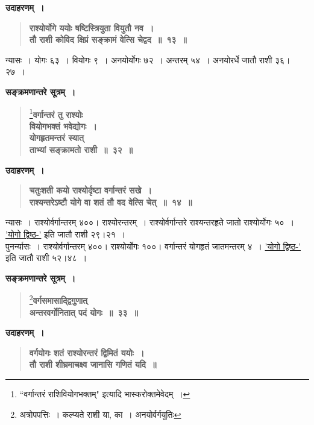 \documentclass[11pt, openany]{book}
\begin{document}
\begin{sloppypar}
\noindent \textbf{उदाहरणम्~।}

 \label{Ex 1.13}
\begin{quote}
\textbf{{\color{red}राश्योर्योगे ययोः षष्टिस्त्रियुता वियुतौ नव~।\\ 
तौ राशी कोविद क्षिप्रं सङ्क्रामं वेत्सि चेद्वद~॥~१३~॥}}
\end{quote}

न्यासः~। योगः ६३~। वियोगः ९~। अनयोर्योगः ७२~। अन्तरम् ५४~। अनयोरर्धे जातौ राशी ३६।२७~।

\begin{center}
\textbf{सङ्क्रमणान्तरे सूत्रम्~।}
\end{center}
\vspace{-3mm}

 \label{1.32}
\begin{quote}
\renewcommand{\thefootnote}{१}\footnote{{\color{violet}``वर्गान्तरं राशिवियोगभक्तम्"} इत्यादि {\color{violet}भास्करो}क्तमेवेदम्~।}{\large \textbf{{\color{purple}वर्गान्तरं तु राश्योः \\
वियोगभक्तं भवेद्योगः~।\\ 
योगहृतमन्तरं स्यात् \\
ताभ्यां सङ्क्रामतो राशी~॥~३२~॥}}}
\end{quote}

\noindent \textbf{उदाहरणम्~।}

 \label{Ex 1.14}
\begin{quote}
\textbf{{\color{red}चतुःशती कयो राश्योर्दृष्टा वर्गान्तरं सखे~।\\ 
राश्यन्तरेऽष्टौ योगे वा शतं तौ वद वेत्सि चेत्~॥~१४~॥}}
\end{quote}

न्यासः~। राश्योर्वर्गान्तरम् ४००। राश्योरन्तरम्~। राश्योर्वर्गान्तरे राश्यन्तरहृते जातो राश्योर्योगः ५०~। \hyperref[1.31]{'योगो द्विष्ठ-'} इति जातौ राशी २९।२१~।\\

पुनर्न्यासः~। राश्योर्वर्गान्तरम् ४००। राश्योर्योगः १००। वर्गान्तरं योगहृतं जातमन्तरम् ४~। \hyperref[1.31]{'योगो द्विष्ठ-'} इति जातौ राशी ५२।४८~।
\vspace{2mm}

\begin{center}
\textbf{सङ्क्रमणान्तरे सूत्रम्~।}
\end{center}
\vspace{-3mm}

 \label{1.33}
\begin{quote}
\renewcommand{\thefootnote}{२}\footnote{अत्रोपपत्तिः~। कल्प्यते राशी या, का~। अनयोर्वर्गयुतिः}{\large \textbf{{\color{purple}वर्गसमासाद्द्विगुणात्\\
अन्तरवर्गोनितात् पदं योगः~॥~३३~॥}}}
\end{quote}

\noindent \textbf{उदाहरणम्~।}

 \label{Ex 1.15.1}
\begin{quote}
\textbf{{\color{red}वर्गयोगः शतं राश्योरन्तरं द्विमितं ययोः~।\\ 
तौ राशी शीघ्रमाचक्ष्व जानासि गणितं यदि~॥}}
\end{quote}
\end{sloppypar}
\end{document}
